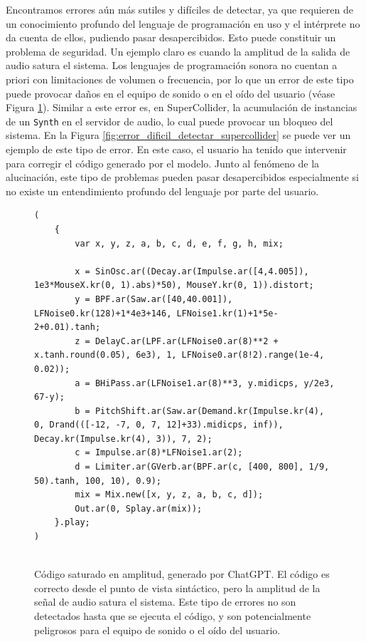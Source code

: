 Encontramos errores aún más sutiles y difíciles de detectar, ya que requieren de un conocimiento profundo del lenguaje de programación en uso y el intérprete no da cuenta de ellos, pudiendo pasar desapercibidos. Esto puede constituir un problema de seguridad. Un ejemplo claro es cuando la amplitud de la salida de audio satura el sistema. Los lenguajes de programación sonora no cuentan a priori con limitaciones de volumen o frecuencia, por lo que un error de este tipo puede provocar daños en el equipo de sonido o en el oído del usuario (véase Figura \ref{fig:amplitud_saturada_chatgpt}). Similar a este error es, en SuperCollider, la acumulación de instancias de un \texttt{Synth} en el servidor de audio, lo cual puede provocar un bloqueo del sistema. En la Figura \ref{fig:error_dificil_detectar_supercollider} se puede ver un ejemplo de este tipo de error. En este caso, el usuario ha tenido que intervenir para corregir el código generado por el modelo. Junto al fenómeno de la alucinación, este tipo de problemas pueden pasar desapercibidos especialmente si no existe un entendimiento profundo del lenguaje por parte del usuario.

\begin{figure}[H]
    \caption[Código saturado en amplitud, generado por ChatGPT]{Código saturado en amplitud, generado por ChatGPT. El código es correcto desde el punto de vista sintáctico, pero la amplitud de la señal de audio satura el sistema. Este tipo de errores no son detectados hasta que se ejecuta el código, y son potencialmente peligrosos para el equipo de sonido o el oído del usuario.}
    \centering
    \begin{lstlisting}[style=SuperCollider-IDE, basicstyle=\footnotesize\ttfamily, numbers=none]
(
    {
        var x, y, z, a, b, c, d, e, f, g, h, mix;
        
        x = SinOsc.ar((Decay.ar(Impulse.ar([4,4.005]), 1e3*MouseX.kr(0, 1).abs)*50), MouseY.kr(0, 1)).distort;
        y = BPF.ar(Saw.ar([40,40.001]), LFNoise0.kr(128)+1*4e3+146, LFNoise1.kr(1)+1*5e-2+0.01).tanh;
        z = DelayC.ar(LPF.ar(LFNoise0.ar(8)**2 + x.tanh.round(0.05), 6e3), 1, LFNoise0.ar(8!2).range(1e-4, 0.02));
        a = BHiPass.ar(LFNoise1.ar(8)**3, y.midicps, y/2e3, 67-y);
        b = PitchShift.ar(Saw.ar(Demand.kr(Impulse.kr(4), 0, Drand(([-12, -7, 0, 7, 12]+33).midicps, inf)), Decay.kr(Impulse.kr(4), 3)), 7, 2);
        c = Impulse.ar(8)*LFNoise1.ar(2);
        d = Limiter.ar(GVerb.ar(BPF.ar(c, [400, 800], 1/9, 50).tanh, 100, 10), 0.9);
        mix = Mix.new([x, y, z, a, b, c, d]);
        Out.ar(0, Splay.ar(mix));
    }.play;
)
            
    \end{lstlisting}
    \source{\propio}
    \label{fig:amplitud_saturada_chatgpt}
\end{figure}


